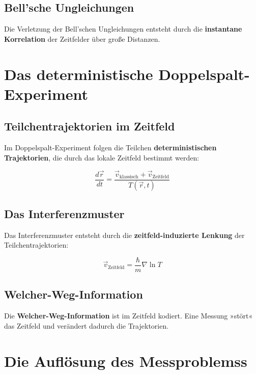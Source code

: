 \documentclass[12pt,a4paper]{report}
\begin{document}
	\subsection{Bell'sche Ungleichungen}
	
	Die Verletzung der Bell'schen Ungleichungen entsteht durch die \textbf{instantane Korrelation} der Zeitfelder über große Distanzen.
	
	\section{Das deterministische Doppelspalt-Experiment}
	
	\subsection{Teilchentrajektorien im Zeitfeld}
	
	Im Doppelspalt-Experiment folgen die Teilchen \textbf{deterministischen Trajektorien}, die durch das lokale Zeitfeld bestimmt werden:
	
	\begin{equation}
		\frac{d\vec{r}}{dt} = \frac{\vec{v}_{\text{klassisch}} + \vec{v}_{\text{Zeitfeld}}}{T(\vec{r},t)}
	\end{equation}
	
	\subsection{Das Interferenzmuster}
	
	Das Interferenzmuster entsteht durch die \textbf{zeitfeld-induzierte Lenkung} der Teilchentrajektorien:
	
	\begin{equation}
		\vec{v}_{\text{Zeitfeld}} = \frac{\hbar}{m}\nabla\ln T
	\end{equation}
	
	\subsection{Welcher-Weg-Information}
	
	Die \textbf{Welcher-Weg-Information} ist im Zeitfeld kodiert. Eine Messung »stört« das Zeitfeld und verändert dadurch die Trajektorien.
	
	\section{Die Auflösung des Messproblemss}
	
\end{document}
